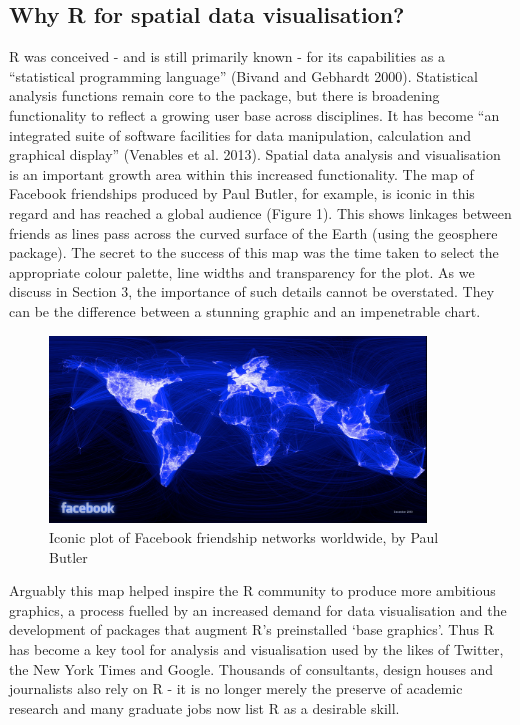 \documentclass[]{article}
\let\Oldincludegraphics\includegraphics
\renewcommand{\includegraphics}[1]{\Oldincludegraphics[width=10cm]{#1}}
\begin{document}
\subsection{Why R for spatial data visualisation?}

R was conceived - and is still primarily known - for its capabilities as
a ``statistical programming language'' (Bivand and Gebhardt 2000).
Statistical analysis functions remain core to the package, but there is
broadening functionality to reflect a growing user base across
disciplines. It has become ``an integrated suite of software facilities
for data manipulation, calculation and graphical display'' (Venables et
al. 2013). Spatial data analysis and visualisation is an important
growth area within this increased functionality. The map of Facebook
friendships produced by Paul Butler, for example, is iconic in this
regard and has reached a global audience (Figure 1). This shows linkages
between friends as lines pass across the curved surface of the Earth (using
the geosphere package). The secret to the success of this map
was the time taken to select the appropriate colour palette, line widths
and transparency for the plot. As we discuss in Section 3, the importance
of such details cannot be overstated. They can be the difference between
a stunning graphic and an impenetrable chart.

\begin{figure}[htbp]
\centering
\includegraphics{figs/butler_facebook.jpg}
\caption{Iconic plot of Facebook friendship networks worldwide, by Paul
Butler}
\end{figure}

Arguably this map helped inspire the R community to produce more ambitious
graphics, a process fuelled by an increased demand for data visualisation
and the development of packages that augment R's preinstalled `base
graphics'. Thus R has become a key tool for analysis and visualisation
used by the likes of Twitter, the New York Times and Google. Thousands
of consultants, design houses and journalists also rely on R - it is no
longer merely the preserve of academic research and many graduate jobs
now list R as a desirable skill.
\end{document}
